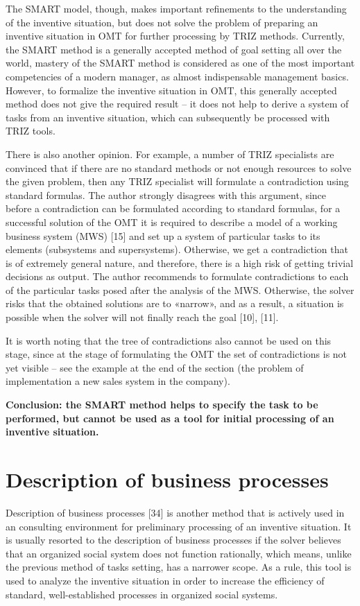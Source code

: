 \documentclass[11pt,a4paper]{book}
\begin{document}
The SMART model, though, makes important refinements to the understanding of
the inventive situation, but does not solve the problem of preparing an
inventive situation in OMT for further processing by TRIZ methods. Currently,
the SMART method is a generally accepted method of goal setting all over the
world, mastery of the SMART method is considered as one of the most important
competencies of a modern manager, as almost indispensable management basics.
However, to formalize the inventive situation in OMT, this generally accepted
method does not give the required result -- it does not help to derive a
system of tasks from an inventive situation, which can subsequently be
processed with TRIZ tools.

There is also another opinion. For example, a number of TRIZ specialists are
convinced that if there are no standard methods or not enough resources to
solve the given problem, then any TRIZ specialist will formulate a
contradiction using standard formulas.  The author strongly disagrees with
this argument, since before a contradiction can be formulated according to
standard formulas, for a successful solution of the OMT it is required to
describe a model of a working business system (MWS) [15] and set up a system
of particular tasks to its elements (subsystems and supersystems). Otherwise,
we get a contradiction that is of extremely general nature, and therefore,
there is a high risk of getting trivial decisions as output. The author
recommends to formulate contradictions to each of the particular tasks posed
after the analysis of the MWS. Otherwise, the solver risks that the obtained
solutions are to «narrow», and as a result, a situation is possible when the
solver will not finally reach the goal [10], [11].

It is worth noting that the tree of contradictions also cannot be used on this
stage, since at the stage of formulating the OMT the set of contradictions is
not yet visible -- see the example at the end of the section (the problem of
implementation a new sales system in the company).

\textbf{Conclusion: the SMART method helps to specify the task to be
  performed, but cannot be used as a tool for initial processing of an
  inventive situation.}

\section{Description of business processes}

Description of business processes [34] is another method that is actively used
in an consulting environment for preliminary processing of an inventive
situation.  It is usually resorted to the description of business processes if
the solver believes that an organized social system does not function
rationally, which means, unlike the previous method of tasks setting, has a
narrower scope. As a rule, this tool is used to analyze the inventive
situation in order to increase the efficiency of standard, well-established
processes in organized social systems.
\end{document}
